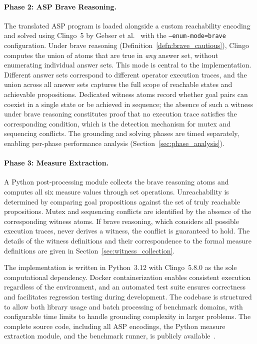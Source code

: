 \paragraph{Phase 2: ASP Brave Reasoning.}
The translated \ac{ASP} program is loaded alongside a custom reachability encoding and solved using Clingo~5 by Gebser et al.~\cite{Gebser2012} with the \texttt{--enum-mode=brave} configuration. Under brave reasoning (Definition~\ref{defn:brave_cautious}), Clingo computes the union of atoms that are true in \emph{any} answer set, without enumerating individual answer sets. This mode is central to the implementation. Different answer sets correspond to different operator execution traces, and the union across all answer sets captures the full scope of reachable states and achievable propositions. Dedicated witness atoms record whether goal pairs can coexist in a single state or be achieved in sequence; the absence of such a witness under brave reasoning constitutes proof that no execution trace satisfies the corresponding condition, which is the detection mechanism for mutex and sequencing conflicts. The grounding and solving phases are timed separately, enabling per-phase performance analysis (Section~\ref{sec:phase_analysis}).

\paragraph{Phase 3: Measure Extraction.}
A Python post-processing module collects the brave reasoning atoms and computes all six measure values through set operations. Unreachability is determined by comparing goal propositions against the set of truly reachable propositions. Mutex and sequencing conflicts are identified by the absence of the corresponding witness atoms. If brave reasoning, which considers all possible execution traces, never derives a witness, the conflict is guaranteed to hold. The details of the witness definitions and their correspondence to the formal measure definitions are given in Section~\ref{sec:witness_collection}.

The implementation is written in Python~3.12 with Clingo~5.8.0 as the sole computational dependency. Docker containerization enables consistent execution regardless of the environment, and an automated test suite ensures correctness and facilitates regression testing during development. The codebase is structured to allow both library usage and batch processing of benchmark domains, with configurable time limits to handle grounding complexity in larger problems. The complete source code, including all \ac{ASP} encodings, the Python measure extraction module, and the benchmark runner, is publicly available~\cite{Bunge2026}.

